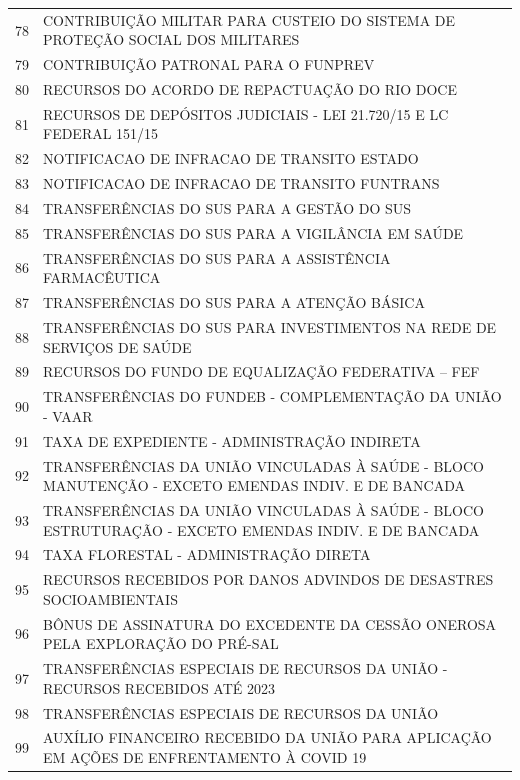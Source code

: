 \documentclass{article}
\begin{document}
\begin{longtable}[c]{m{1cm}|m{11cm}}
\multicolumn{1}{c|}{ 78 } & CONTRIBUIÇÃO MILITAR PARA CUSTEIO DO SISTEMA DE PROTEÇÃO SOCIAL DOS MILITARES \\
\multicolumn{1}{c|}{ 79 } & CONTRIBUIÇÃO PATRONAL PARA O FUNPREV \\
\multicolumn{1}{c|}{ 80 } & RECURSOS DO ACORDO DE REPACTUAÇÃO DO RIO DOCE \\
\multicolumn{1}{c|}{ 81 } & RECURSOS DE DEPÓSITOS JUDICIAIS - LEI 21.720/15 E LC FEDERAL 151/15 \\
\multicolumn{1}{c|}{ 82 } & NOTIFICACAO DE INFRACAO DE TRANSITO ESTADO \\
\multicolumn{1}{c|}{ 83 } & NOTIFICACAO DE INFRACAO DE TRANSITO FUNTRANS \\
\multicolumn{1}{c|}{ 84 } & TRANSFERÊNCIAS DO SUS PARA A GESTÃO DO SUS \\
\multicolumn{1}{c|}{ 85 } & TRANSFERÊNCIAS DO SUS PARA A VIGILÂNCIA EM SAÚDE \\
\multicolumn{1}{c|}{ 86 } & TRANSFERÊNCIAS DO SUS PARA A ASSISTÊNCIA FARMACÊUTICA \\
\multicolumn{1}{c|}{ 87 } & TRANSFERÊNCIAS DO SUS PARA A ATENÇÃO BÁSICA \\
\multicolumn{1}{c|}{ 88 } & TRANSFERÊNCIAS DO SUS PARA INVESTIMENTOS NA REDE DE SERVIÇOS DE SAÚDE \\
\multicolumn{1}{c|}{ 89 } & RECURSOS DO FUNDO DE EQUALIZAÇÃO FEDERATIVA – FEF \\
\multicolumn{1}{c|}{ 90 } & TRANSFERÊNCIAS DO FUNDEB - COMPLEMENTAÇÃO DA UNIÃO - VAAR \\
\multicolumn{1}{c|}{ 91 } & TAXA DE EXPEDIENTE - ADMINISTRAÇÃO INDIRETA \\
\multicolumn{1}{c|}{ 92 } & TRANSFERÊNCIAS DA UNIÃO VINCULADAS À SAÚDE - BLOCO MANUTENÇÃO - EXCETO EMENDAS INDIV. E DE BANCADA \\
\multicolumn{1}{c|}{ 93 } & TRANSFERÊNCIAS DA UNIÃO VINCULADAS À SAÚDE - BLOCO ESTRUTURAÇÃO - EXCETO EMENDAS INDIV. E DE BANCADA \\
\multicolumn{1}{c|}{ 94 } & TAXA FLORESTAL - ADMINISTRAÇÃO DIRETA \\
\multicolumn{1}{c|}{ 95 } & RECURSOS RECEBIDOS POR DANOS ADVINDOS DE DESASTRES SOCIOAMBIENTAIS \\
\multicolumn{1}{c|}{ 96 } & BÔNUS DE ASSINATURA DO EXCEDENTE DA CESSÃO ONEROSA PELA EXPLORAÇÃO DO PRÉ-SAL \\
\multicolumn{1}{c|}{ 97 } & TRANSFERÊNCIAS ESPECIAIS DE RECURSOS DA UNIÃO - RECURSOS RECEBIDOS ATÉ 2023 \\
\multicolumn{1}{c|}{ 98 } & TRANSFERÊNCIAS ESPECIAIS DE RECURSOS DA UNIÃO \\
\multicolumn{1}{c|}{ 99 } & AUXÍLIO FINANCEIRO RECEBIDO DA UNIÃO PARA APLICAÇÃO EM AÇÕES DE ENFRENTAMENTO À COVID 19 \\
\end{longtable}
\end{document}
